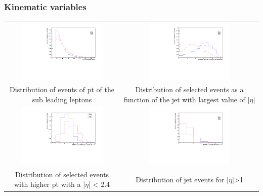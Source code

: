 \documentclass[11pt]{beamer}
\newcommand\Fontvi{\fontsize{4}{7.2}\selectfont}
\newcommand{\nologo}{\setbeamertemplate{logo}{}}
\begin{document}
{\nologo
	\begin{frame}
		\frametitle{Kinematic variables}
		\Fontvi
		\begin{center}
			\begin{tabular}{cc}
				\includegraphics[width=5.5cm,height=3cm]{figures/distributions/compare_variables-pt-sub} &
				\includegraphics[width=5.5cm,height=3cm]{figures/distributions/compare_variables-abs-pj-eta}\\ 
				{Distribution of events of pt of the sub leading leptons} &{Distribution of selected events as a function of the jet with largest value of $|\eta|$}\\
				\includegraphics[width=5.5cm,height=3cm]{figures/distributions/compare_variablescompare_variables-ncj24}&
				\includegraphics[width=5.5cm,height=3cm]{figures/distributions/compare_variables-nfj}\\		
				{Distribution of selected events with higher pt with a |$\eta$| < 2.4 } & {Distribution of jet events for $|\eta|$>1 } \\
			\end{tabular}
		\end{center}
	\end{frame}
}
\end{document}
